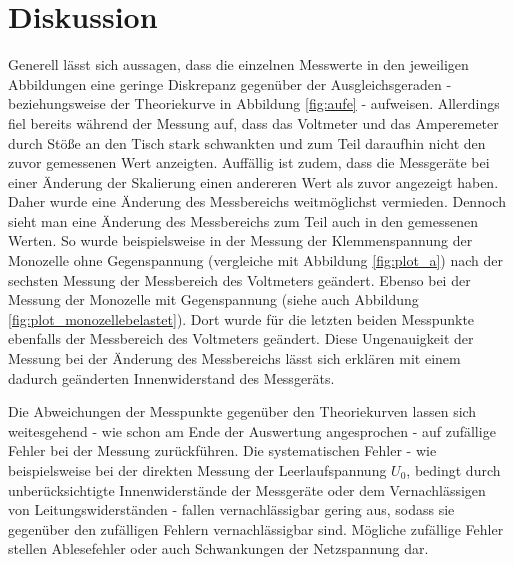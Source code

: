 \section{Diskussion}
\label{sec:Diskussion}
Generell lässt sich aussagen, dass die einzelnen Messwerte in den jeweiligen Abbildungen eine geringe Diskrepanz gegenüber der Ausgleichsgeraden - beziehungsweise der Theoriekurve in Abbildung \ref{fig:aufe} - aufweisen. Allerdings fiel bereits während der Messung auf, dass das Voltmeter und das Amperemeter durch Stöße an den Tisch stark schwankten und zum Teil daraufhin nicht den zuvor gemessenen Wert anzeigten.
Auffällig ist zudem, dass die Messgeräte bei einer Änderung der Skalierung einen andereren Wert als zuvor angezeigt haben. Daher wurde eine Änderung des Messbereichs weitmöglichst vermieden.
Dennoch sieht man eine Änderung des Messbereichs zum Teil auch in den gemessenen Werten. So wurde beispielsweise in der Messung der Klemmenspannung der Monozelle ohne Gegenspannung (vergleiche mit Abbildung \ref{fig:plot_a}) nach der sechsten Messung der Messbereich des Voltmeters geändert.
Ebenso bei der Messung der Monozelle mit Gegenspannung (siehe auch Abbildung \ref{fig:plot_monozellebelastet}). Dort wurde für die letzten beiden Messpunkte ebenfalls der Messbereich des Voltmeters geändert.
Diese Ungenauigkeit der Messung bei der Änderung des Messbereichs lässt sich erklären mit einem dadurch geänderten Innenwiderstand des Messgeräts.

Die Abweichungen der Messpunkte gegenüber den Theoriekurven lassen sich weitesgehend - wie schon am Ende der Auswertung angesprochen - auf zufällige Fehler bei der Messung zurückführen.
Die systematischen Fehler - wie beispielsweise bei der direkten Messung der Leerlaufspannung $U_0$, bedingt durch unberücksichtigte Innenwiderstände der Messgeräte oder dem Vernachlässigen von Leitungswiderständen - fallen vernachlässigbar gering aus, sodass sie gegenüber den zufälligen Fehlern vernachlässigbar sind.
Mögliche zufällige Fehler stellen Ablesefehler oder auch Schwankungen der Netzspannung dar.

